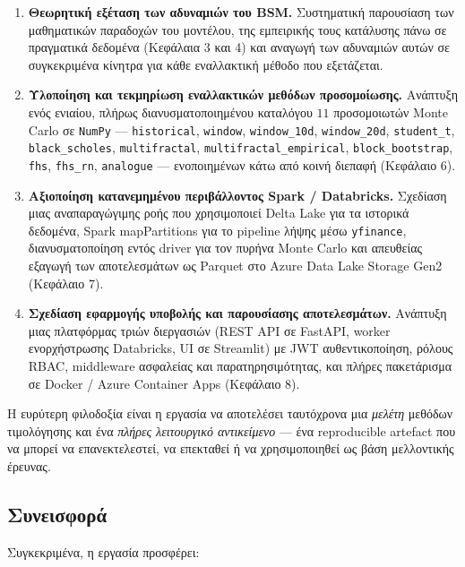 \documentclass[12pt]{article}
\begin{document}
\begin{enumerate}
  \item \textbf{Θεωρητική εξέταση των αδυναμιών του BSM.} Συστηματική παρουσίαση των μαθηματικών παραδοχών του μοντέλου, της εμπειρικής τους κατάλυσης πάνω σε πραγματικά δεδομένα (Κεφάλαια 3 και 4) και αναγωγή των αδυναμιών αυτών σε συγκεκριμένα κίνητρα για κάθε εναλλακτική μέθοδο που εξετάζεται.
  \item \textbf{Υλοποίηση και τεκμηρίωση εναλλακτικών μεθόδων προσομοίωσης.} Ανάπτυξη ενός ενιαίου, πλήρως διανυσματοποιημένου καταλόγου $11$ προσομοιωτών Monte Carlo σε \texttt{NumPy} — \texttt{historical}, \texttt{window}, \texttt{window\_10d}, \texttt{window\_20d}, \texttt{student\_t}, \texttt{black\_scholes}, \texttt{multifractal}, \texttt{multifractal\_empirical}, \texttt{block\_bootstrap}, \texttt{fhs}, \texttt{fhs\_rn}, \texttt{analogue} — ενοποιημένων κάτω από κοινή διεπαφή (Κεφάλαιο 6).
  \item \textbf{Αξιοποίηση κατανεμημένου περιβάλλοντος Spark / Databricks.} Σχεδίαση μιας αναπαραγώγιμης ροής που χρησιμοποιεί Delta Lake για τα ιστορικά δεδομένα, Spark mapPartitions για το pipeline λήψης μέσω \texttt{yfinance}, διανυσματοποίηση εντός driver για τον πυρήνα Monte Carlo και απευθείας εξαγωγή των αποτελεσμάτων ως Parquet στο Azure Data Lake Storage Gen2 (Κεφάλαιο 7).
  \item \textbf{Σχεδίαση εφαρμογής υποβολής και παρουσίασης αποτελεσμάτων.} Ανάπτυξη μιας πλατφόρμας τριών διεργασιών (REST API σε FastAPI, worker ενορχήστρωσης Databricks, UI σε Streamlit) με JWT αυθεντικοποίηση, ρόλους RBAC, middleware ασφαλείας και παρατηρησιμότητας, και πλήρες πακετάρισμα σε Docker / Azure Container Apps (Κεφάλαιο 8).
\end{enumerate}

Η ευρύτερη φιλοδοξία είναι η εργασία να αποτελέσει ταυτόχρονα μια \emph{μελέτη} μεθόδων τιμολόγησης και ένα \emph{πλήρες λειτουργικό αντικείμενο} — ένα reproducible artefact που να μπορεί να επανεκτελεστεί, να επεκταθεί ή να χρησιμοποιηθεί ως βάση μελλοντικής έρευνας.

\subsection{Συνεισφορά}
Συγκεκριμένα, η εργασία προσφέρει:
\end{document}
